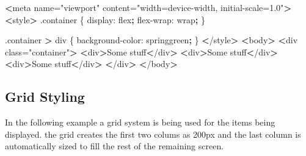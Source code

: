 \documentclass[]{book}
\newenvironment{Shaded}{\begin{snugshade}}{\end{snugshade}}
\newcommand{\ExtensionTok}[1]{#1}
\newcommand{\KeywordTok}[1]{\textcolor[rgb]{0.13,0.29,0.53}{\textbf{#1}}}
\newcommand{\NormalTok}[1]{#1}
\newcommand{\OperatorTok}[1]{\textcolor[rgb]{0.81,0.36,0.00}{\textbf{#1}}}
\newcommand{\StringTok}[1]{\textcolor[rgb]{0.31,0.60,0.02}{#1}}
\begin{document}
\begin{Shaded}
\begin{Highlighting}[]
\OperatorTok{<}\ExtensionTok{meta}\NormalTok{ name=}\StringTok{"viewport"}\NormalTok{ content=}\StringTok{"width=device-width, initial-scale=1.0"}\OperatorTok{>}
\OperatorTok{<}\ExtensionTok{style}\OperatorTok{>}
    \ExtensionTok{.container}\NormalTok{ \{}
        \ExtensionTok{display}\NormalTok{: flex}\KeywordTok{;}
        \ExtensionTok{flex-wrap}\NormalTok{: wrap}\KeywordTok{;}
\NormalTok{    \}}

    \ExtensionTok{.container} \OperatorTok{>}\NormalTok{ div \{}
        \ExtensionTok{background-color}\NormalTok{: springgreen}\KeywordTok{;}
\NormalTok{    \}}
\OperatorTok{<}\NormalTok{/}\ExtensionTok{style}\OperatorTok{>}
\OperatorTok{<}\ExtensionTok{body}\OperatorTok{>}
    \OperatorTok{<}\ExtensionTok{div}\NormalTok{ class=}\StringTok{"container"}\OperatorTok{>}
        \OperatorTok{<}\ExtensionTok{div}\OperatorTok{>}\NormalTok{Some stuff}\OperatorTok{<}\NormalTok{/div}\OperatorTok{>}
        \OperatorTok{<}\ExtensionTok{div}\OperatorTok{>}\NormalTok{Some stuff}\OperatorTok{<}\NormalTok{/div}\OperatorTok{>}
        \OperatorTok{<}\ExtensionTok{div}\OperatorTok{>}\NormalTok{Some stuff}\OperatorTok{<}\NormalTok{/div}\OperatorTok{>}
    \OperatorTok{<}\NormalTok{/}\ExtensionTok{div}\OperatorTok{>}
\OperatorTok{<}\NormalTok{/}\ExtensionTok{body}\OperatorTok{>}
\end{Highlighting}
\end{Shaded}

\hypertarget{grid-styling}{%
\subsection{Grid Styling}\label{grid-styling}}

In the following example a grid system is being used for the items being displayed. the grid creates the first two colums as 200px and the last column is automatically sized to fill the rest of the remaining screen.
\end{document}
